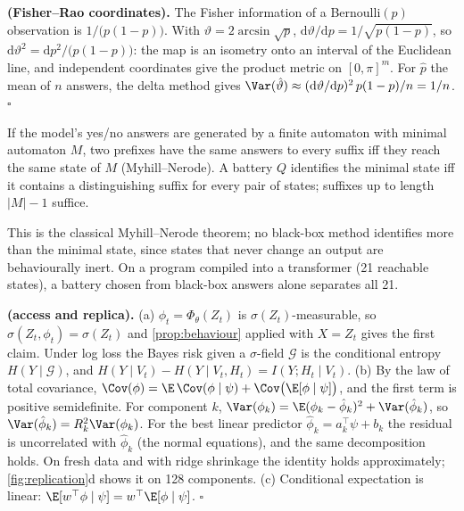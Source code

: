 \textbf{ (Fisher--Rao coordinates).} The Fisher information of a Bernoulli$(p)$ observation is $1/\big(p(1-p)\big)$.
With $\vartheta=2\arcsin\sqrt p$, $\mathrm{d}\vartheta/\mathrm{d}p=1/\sqrt{p(1-p)}$, so $\mathrm{d}\vartheta^2=\mathrm{d}p^2/\big(p(1-p)\big)$: the
map is an isometry onto an interval of the Euclidean line, and independent coordinates give the product metric on $[0,\pi]^m$.
For $\hat p$ the mean of $n$ answers, the delta method gives $\Var(\hat\vartheta)\approx(\mathrm{d}\vartheta/\mathrm{d}p)^2\,p(1-p)/n=1/n$. $\square$

\begin{proposition}\label{prop:mn}
If the model's yes/no answers are generated by a finite automaton with minimal automaton $M$, two prefixes have the same
answers to every suffix iff they reach the same state of $M$ (Myhill--Nerode). A battery $Q$ identifies the minimal state
iff it contains a distinguishing suffix for every pair of states; suffixes up to length $|M|-1$ suffice.
\end{proposition}
This is the classical Myhill--Nerode theorem; no black-box method identifies more than the minimal state, since states that
never change an output are behaviourally inert. On a program compiled into a transformer (21 reachable states), a battery
chosen from black-box answers alone separates all 21.

\textbf{ (access and replica).}
(a) $\phi_t=\Phi_\theta(Z_t)$ is $\sigma(Z_t)$-measurable, so $\sigma(Z_t,\phi_t)=\sigma(Z_t)$ and \cref{prop:behaviour} applied with
$X=Z_t$ gives the first claim. Under log loss the Bayes risk given a $\sigma$-field $\mathcal G$ is the conditional entropy
$H(Y\mid\mathcal G)$, and $H(Y\mid V_t)-H(Y\mid V_t,H_t)=I(Y;H_t\mid V_t)$.
(b) By the law of total covariance, $\Cov(\phi)=\E\,\Cov(\phi\mid\psi)+\Cov\big(\E[\phi\mid\psi]\big)$, and the first term is positive
semidefinite. For component $k$, $\Var(\phi_k)=\E(\phi_k-\hat\phi_k)^2+\Var(\hat\phi_k)$, so $\Var(\hat\phi_k)=R^2_k\Var(\phi_k)$. For the
best linear predictor $\hat\phi_k=a_k^\top\psi+b_k$ the residual is uncorrelated with $\hat\phi_k$ (the normal equations), and
the same decomposition holds. On fresh data and with ridge shrinkage the identity holds approximately; \cref{fig:replication}d
shows it on 128 components.
(c) Conditional expectation is linear: $\E[w^\top\phi\mid\psi]=w^\top\E[\phi\mid\psi]$. $\square$

